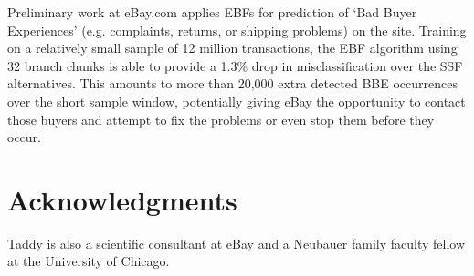 \documentclass{article}
\begin{document}
Preliminary work at eBay.com applies EBFs for prediction of `Bad Buyer Experiences' (e.g. complaints, returns, or shipping problems) on the site.  Training on a relatively small sample of 12 million transactions, the EBF algorithm using 32 branch chunks is able to provide a 1.3\% drop in misclassification over the SSF alternatives.  This amounts to more than 20,000 extra detected BBE occurrences over the short sample window, potentially giving eBay the opportunity to contact those buyers and attempt to fix the problems or even stop them before they occur.

\section*{Acknowledgments} 
 
Taddy is also a scientific consultant at eBay and a Neubauer
family faculty fellow at the University of Chicago.



\end{document}
